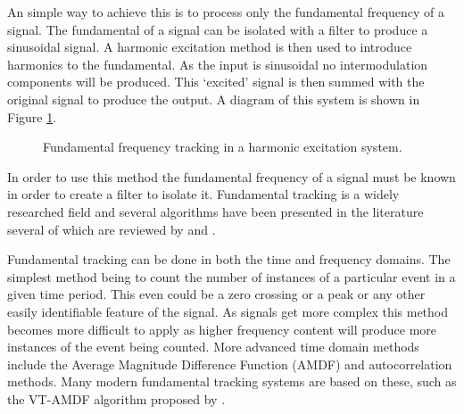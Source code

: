 		An simple way to achieve this is to process only the fundamental frequency of a signal. The fundamental of
		a signal can be isolated with a filter to produce a sinusoidal signal. A harmonic excitation method is then
		used to introduce harmonics to the fundamental. As the input is sinusoidal no intermodulation components
		will be produced. This `excited' signal is then summed with the original signal to produce the output. A
		diagram of this system is shown in Figure \ref{fig:F0Tracking}.

		\begin{figure}[h!]
			\centering
			\caption{Fundamental frequency tracking in a harmonic excitation system.}
			\label{fig:F0Tracking}
		\end{figure}

		In order to use this method the fundamental frequency of a signal must be known in order to create a filter
		to isolate it. Fundamental tracking is a widely researched field and several algorithms have been presented
		in the literature several of which are reviewed by \citet{cuadra2001efficient} and
		\citet{gerhard2003pitch}.

		Fundamental tracking can be done in both the time and frequency domains. The simplest method being to count
		the number of instances of a particular event in a given time period. This even could be a zero crossing or
		a peak or any other easily identifiable feature of the signal. As signals get more complex this method
		becomes more difficult to apply as higher frequency content will produce more instances of the event being
		counted. More advanced time domain methods include the Average Magnitude Difference Function (AMDF) and
		autocorrelation methods. Many modern fundamental tracking systems are based on these, such as the VT-AMDF
		algorithm proposed by \citet{prukkanon2009vt-amdf}.


